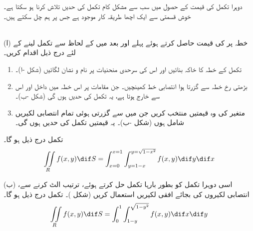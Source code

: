 دوہرا تکمل کی قیمت کے حصول میں سب سے مشکل کام تکمل کی  حدیں  تلاش کرنا ہو سکتا ہے۔ خوش قسمتی سے   ایک  اچھا  طریقہ کار موجود ہے جس پر ہم چل سکتے ہیں۔ 

\\
(ا) \quad
   خطہ  پر  کی قیمت حاصل کرتے ہوئے  پہلے  اور بعد میں  کے لحاظ سے تکمل لینے کے لئے درج ذیل اقدام کریں۔
\begin{enumerate}[1.]
\item
{}\quad
تکمل کے   خطہ کا خاکہ بنائیں اور اس کی سرحدی منحنیات   پر نام و نشان لگائیں (شکل -ا)۔
\item
{}\quad
بڑھتی  رخ خطہ  سے گزرتا ہوا انتصابی  خط  کھینچیں۔ جن مقامات  پر   اس خطہ میں داخل   اور اس سے     خارج ہوتا ہے، یہ تکمل کی   حدیں  ہوں گی (شکل -ب)۔
\item
 \quad
متغیر    کی وہ قیمتیں  منتخب کریں جن میں  سے گزرتی ہوئی تمام انتصابی  لکیریں شامل ہوں (شکل -ب)۔ یہ قیمتیں تکمل کی  حدیں ہوں گی۔
\end{enumerate}
 تکمل درج ذیل ہو گا۔
\begin{align*}
\iint\limits_R f(x,y)\dif S=\int_{x=0}^{x=1}\int_{y=1-x}^{y=\sqrt{1-x^2}}f(x,y)\dif y\dif x
\end{align*}

(ب) \quad 
اسی دوہرا تکمل کو   بطور  بارہا تکمل حل کرتے ہوئے، ترتیب الٹ کرنے سے، انتصابی لکیروں کی بجائے  افقی لکیریں استعمال کریں (شکل )۔ تکمل درج ذیل ہو گا۔
\begin{align*}
\iint\limits_R f(x,y)\dif S=\int_0^1\int_{1-y}^{\sqrt{1-y^2}}f(x,y)\dif x\dif y
\end{align*} 

